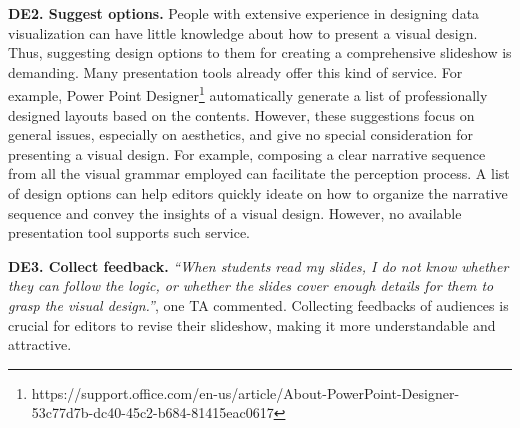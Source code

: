 \noindent
\textbf{DE2. Suggest options.}
People with extensive experience in designing data visualization can have little knowledge about how to present a visual design. 
Thus, suggesting design options to them for creating a comprehensive slideshow is demanding. Many presentation tools already offer this kind of service. For example, Power Point Designer\footnote{https://support.office.com/en-us/article/About-PowerPoint-Designer-53c77d7b-dc40-45c2-b684-81415eac0617} automatically generate a list of professionally designed layouts based on the contents. However, these suggestions focus on general issues, especially on aesthetics, and give no special consideration for presenting a visual design.
For example, composing a clear narrative sequence from all the visual grammar employed can facilitate the perception process. A list of design options can help editors quickly ideate on how to organize the narrative sequence and convey the insights of a visual design. However, no available presentation tool supports such service. 

\noindent
\textbf{DE3. Collect feedback.} \textit{``When students read my slides, I do not know whether they can follow the logic, or whether the slides cover enough details for them to grasp the visual design.''}, one TA commented. 
Collecting feedbacks of audiences is crucial for editors to revise their slideshow, making it more understandable and attractive.  

